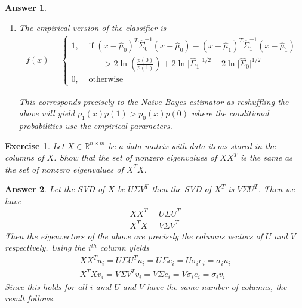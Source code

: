 \documentclass[12pt]{article}
\theoremstyle{colon}
\newtheorem{exercise}{Exercise}
\newtheorem*{answer}{Answer}
\begin{document}
\begin{answer}
\begin{enumerate}[label=\alph*)]
      Which of course is a qudratic boundary.
    \item The empirical version of the classifier is
      \begin{gather*}
        f(x) = \begin{cases}
          1, &\text{ if } (x - \hat{\mu}_0)^T \hat{\Sigma}_0^{-1} (x - \hat{\mu}_0) - (x - \hat{\mu}_1)^T \hat{\Sigma}_1^{-1} (x - \hat{\mu}_1) \\
          &\quad\quad > 2 \ln \left( \frac{p(0)}{p(1)} \right) + 2 \ln \lvert \hat{\Sigma}_1 \rvert^{1/2} - 2 \ln \lvert \hat{\Sigma}_0 \rvert^{1/2} \\
          0, &\text{ otherwise}
        \end{cases}
      \end{gather*}

      This corresponds precisely to the Naive Bayes estimator as reshuffling the above will yield $p_1(x) p(1) > p_0(x) p(0)$ where the conditional probabilities use the empirical parameters.
  \end{enumerate}
\end{answer}

\clearpage

\begin{exercise}
  Let $X \in \mathbb{R}^{n \times m}$ be a data matrix with data items stored in the columns of $X$. Show that the set of nonzero eigenvalues of $X X^T$ is the same as the set of nonzero eigenvalues of $X^T X$.
\end{exercise}

\begin{answer}
  Let the SVD of $X$ be $U \Sigma V^T$ then the SVD of $X^T$ is $V \Sigma U^T$. Then we have
  \begin{gather*}
    X X^T = U \Sigma U^T \\
    X^T X = V \Sigma V^T
  \end{gather*}
  Then the eigenvectors of the above are precisely the columns vectors of $U$ and $V$ respectively. Using the $i^{th}$ column yields
  \begin{gather*}
    X X^T u_i = U \Sigma U^T u_i = U \Sigma e_i = U \sigma_i e_i = \sigma_i u_i \\
    X^T X v_i = V \Sigma V^T v_i = V \Sigma e_i = V \sigma_i e_i = \sigma_i v_i
  \end{gather*}
  Since this holds for all $i$ amd $U$ and $V$ have the same number of columns, the result follows.
\end{answer}
\end{document}
